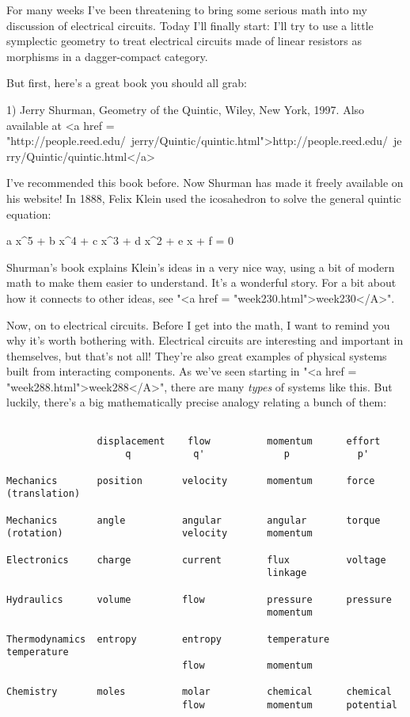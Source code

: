 

For many weeks I've been threatening to bring some serious math into
my discussion of electrical circuits.  Today I'll finally start: I'll
try to use a little symplectic geometry to treat electrical circuits
made of linear resistors as morphisms in a dagger-compact category.

But first, here's a great book you should all grab:

1) Jerry Shurman, Geometry of the Quintic, Wiley, New York, 1997. 
Also available at <a href = "http://people.reed.edu/~jerry/Quintic/quintic.html">http://people.reed.edu/~jerry/Quintic/quintic.html</a>

I've recommended this book before.  Now Shurman has made it
freely available on his website!  In 1888, Felix Klein used the
icosahedron to solve the general quintic equation:


 a x^{5} + b x^{4} + c x^{3} + d
x^{2} + e x + f = 0

Shurman's book explains Klein's ideas in a very nice way, using a
bit of modern math to make them easier to understand.  It's a
wonderful story.  For a bit about how it connects to other ideas, see
"<a href = "week230.html">week230</A>".

Now, on to electrical circuits.  Before I get into the math, I want to
remind you why it's worth bothering with.  Electrical circuits are
interesting and important in themselves, but that's not all!  They're
also great examples of physical systems built from interacting
components.  As we've seen starting in "<a href =
"week288.html">week288</A>", there are many \emph{types} of systems
like this.  But luckily, there's a big mathematically precise analogy
relating a bunch of them:



\begin{verbatim}

                displacement    flow          momentum      effort
                     q           q'              p            p'

Mechanics       position       velocity       momentum      force
(translation)

Mechanics       angle          angular        angular       torque
(rotation)                     velocity       momentum

Electronics     charge         current        flux          voltage
                                              linkage

Hydraulics      volume         flow           pressure      pressure
                                              momentum

Thermodynamics  entropy        entropy        temperature   temperature
                               flow           momentum

Chemistry       moles          molar          chemical      chemical
                               flow           momentum      potential
\end{verbatim}
    

